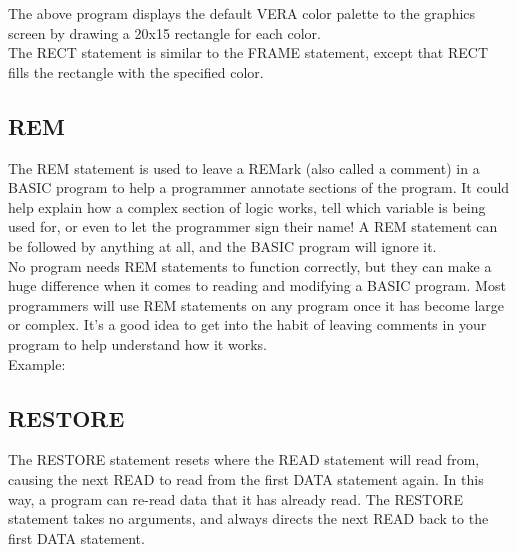 The above program displays the default VERA color palette to the graphics
screen by drawing a 20x15 rectangle for each color.\\

The {\ttfamily RECT} statement is similar to the {\ttfamily FRAME} statement,
except that {\ttfamily RECT} fills the rectangle with the specified color.

\subsection{REM}

The {\ttfamily REM} statement is used to leave a {\ttfamily REM}ark (also
called a comment) in a BASIC program to help a programmer annotate sections of
the program.  It could help explain how a complex section of logic works, tell
which variable is being used for, or even to let the programmer sign their
name!  A {\ttfamily REM} statement can be followed by anything at all, and the
BASIC program will ignore it.\\

No program needs {\ttfamily REM} statements to function correctly, but they can
make a huge difference when it comes to reading and modifying a BASIC program.
Most programmers will use {\ttfamily REM} statements on any program once it has
become large or complex.  It's a good idea to get into the habit of leaving
comments in your program to help understand how it works.\\

Example:\\


\subsection{RESTORE}

The {\ttfamily RESTORE} statement resets where the {\ttfamily READ} statement
will read from, causing the next {\ttfamily READ} to read from the first
{\ttfamily DATA} statement again.  In this way, a program can re-read data that
it has already read.  The {\ttfamily RESTORE} statement takes no arguments, and
always directs the next {\ttfamily READ} back to the first {\ttfamily DATA}
statement.\\

